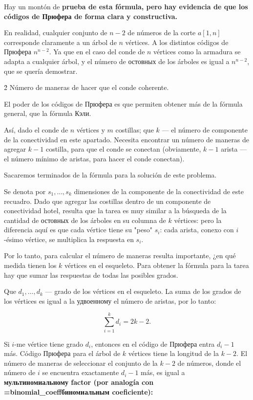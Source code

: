 Hay un montón de \bf{prueba} de esta fórmula, pero hay evidencia de que los códigos de Прюфера de forma clara y constructiva.

En realidad, cualquier conjunto de $n-2$ de números de la corte $a[1, n]$ corresponde claramente a un árbol de $n$ vértices. A los distintos códigos de Прюфера $n^{n-2}$. Ya que en el caso del conde de $n$ vértices como la armadura se adapta a cualquier árbol, y el número de остовных de los árboles es igual a $n^{n-2}$, que se quería demostrar.



\h2{ Número de maneras de hacer que el conde coherente.}

El poder de los códigos de Прюфера es que permiten obtener más de la fórmula general, que la fórmula Кэли.

Así, dado el conde de $n$ vértices y $m$ costillas; que $k$ --- el número de componente de la conectividad en este apartado. Necesita encontrar un número de maneras de agregar $k-1$ costilla, para que el conde se conectan (obviamente, $k-1$ arista --- el número mínimo de aristas, para hacer el conde conectan).

Sacaremos terminados de la fórmula para la solución de este problema.

Se denota por $s_1, \ldots, s_k$ dimensiones de la componente de la conectividad de este recuadro. Dado que agregar las costillas dentro de un componente de conectividad hotel, resulta que la tarea es muy similar a la búsqueda de la cantidad de остовных de los árboles en su columna de $k$ vértices: pero la diferencia aquí es que cada vértice tiene su "peso" $s_i$: cada arista, conexo con $i$-ésimo vértice, se multiplica la respuesta en $s_i$.

Por lo tanto, para calcular el número de maneras resulta importante, ¿en qué medida tienen los $k$ vértices en el esqueleto. Para obtener la fórmula para la tarea hay que sumar las respuestas de todas las posibles grados.

Que $d_1, \ldots, d_k$ --- grado de los vértices en el esqueleto. La suma de los grados de los vértices es igual a la удвоенному el número de aristas, por lo tanto:

$$ \sum_{i=1}^k d_i = 2k-2. $$

Si $i$-me vértice tiene grado $d_i$, entonces en el código de Прюфера entra $d_i-1$ más. Código Прюфера para el árbol de $k$ vértices tiene la longitud de la $k-2$. El número de maneras de seleccionar el conjunto de la $k-2$ de números, donde el número de $i$ se encuentra exactamente $d_i-1$ más, es igual a \bf{мультиномиальному factor} (por analogía con \algohref=binomial_coeff{биномиальным coeficiente}):

